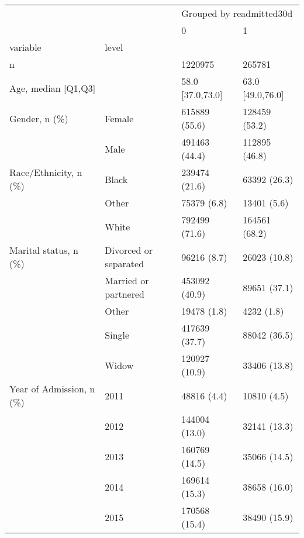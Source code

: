 \begin{tabular}{llll}
\toprule
                                       &   & \multicolumn{2}{l}{Grouped by readmitted30d} \\
                                       &   &                        0 &                 1 \\
variable & level &                          &                   \\
\midrule
n &   &                  1220975 &            265781 \\
Age, median [Q1,Q3] &   &         58.0 [37.0,73.0] &  63.0 [49.0,76.0] \\
Gender, n (\%) & Female &            615889 (55.6) &     128459 (53.2) \\
                                       & Male &            491463 (44.4) &     112895 (46.8) \\
Race/Ethnicity, n (\%) & Black &            239474 (21.6) &      63392 (26.3) \\
                                       & Other &              75379 (6.8) &       13401 (5.6) \\
                                       & White &            792499 (71.6) &     164561 (68.2) \\
Marital status, n (\%) & Divorced or separated &              96216 (8.7) &      26023 (10.8) \\
                                       & Married or partnered &            453092 (40.9) &      89651 (37.1) \\
                                       & Other &              19478 (1.8) &        4232 (1.8) \\
                                       & Single &            417639 (37.7) &      88042 (36.5) \\
                                       & Widow &            120927 (10.9) &      33406 (13.8) \\
Year of Admission, n (\%) & 2011 &              48816 (4.4) &       10810 (4.5) \\
                                       & 2012 &            144004 (13.0) &      32141 (13.3) \\
                                       & 2013 &            160769 (14.5) &      35066 (14.5) \\
                                       & 2014 &            169614 (15.3) &      38658 (16.0) \\
                                       & 2015 &            170568 (15.4) &      38490 (15.9) \\

\end{tabular}
